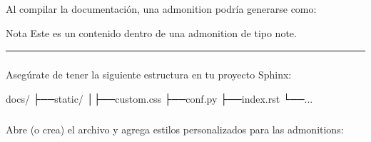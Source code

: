 \documentclass[a4paper,10pt,spanish]{sphinxmanual}
\begin{document}
\subparagraph{}
\label{\detokenize{configuracion_inicial/013.guia_de_myst_parser:estructura-html-generada-por-una-admonition}}
\sphinxAtStartPar
Al compilar la documentación, una admonition podría generarse como:

\begin{sphinxVerbatim}[commandchars=\\\{\}]
 
   Nota
  Este es un contenido dentro de una admonition de tipo \PYGZdq{}note\PYGZdq{}.
\end{sphinxVerbatim}


\bigskip\hrule\bigskip



\paragraph{}
\label{\detokenize{configuracion_inicial/013.guia_de_myst_parser:crear-un-archivo-de-estilos-personalizado-en-sphinx}}

\subparagraph{}
\label{\detokenize{configuracion_inicial/013.guia_de_myst_parser:estructura-del-proyecto}}
\sphinxAtStartPar
Asegúrate de tener la siguiente estructura en tu proyecto Sphinx:

\begin{sphinxVerbatim}[commandchars=\\\{\}]
docs/
├──\PYGZus{}static/
│├──custom.css
├──conf.py
├──index.rst
└──...
\end{sphinxVerbatim}


\subparagraph{}
\label{\detokenize{configuracion_inicial/013.guia_de_myst_parser:editar-el-archivo-custom-css}}
\sphinxAtStartPar
Abre (o crea) el archivo  y agrega estilos personalizados para las admonitions:
\end{document}
